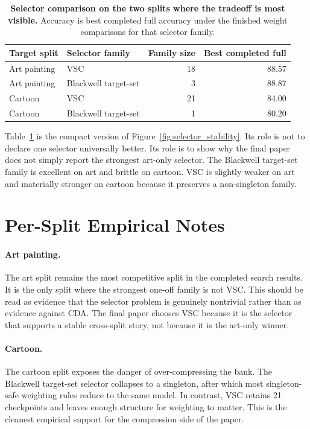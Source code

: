 \documentclass{article}
\theoremstyle{definition}
\begin{document}
\begin{table}[h]
\centering
\caption{\textbf{Selector comparison on the two splits where the tradeoff is most visible.} Accuracy is best completed full accuracy under the finished weight comparisons for that selector family.}
\label{tab:selector_tradeoff}
\begin{tabular}{llrr}
\toprule
Target split & Selector family & Family size & Best completed full \\
\midrule
Art painting & VSC & 18 & 88.57 \\
Art painting & Blackwell target-set & 3 & 88.87 \\
Cartoon & VSC & 21 & 84.00 \\
Cartoon & Blackwell target-set & 1 & 80.20 \\
\bottomrule
\end{tabular}
\end{table}

Table~\ref{tab:selector_tradeoff} is the compact version of Figure~\ref{fig:selector_stability}. Its role is not to declare one selector universally better. Its role is to show why the final paper does not simply report the strongest art-only selector. The Blackwell target-set family is excellent on art and brittle on cartoon. VSC is slightly weaker on art and materially stronger on cartoon because it preserves a non-singleton family.

\section{Per-Split Empirical Notes}

\paragraph{Art painting.}
The art split remains the most competitive split in the completed search results. It is the only split where the strongest one-off family is not VSC. This should be read as evidence that the selector problem is genuinely nontrivial rather than as evidence against CDA. The final paper chooses VSC because it is the selector that supports a stable cross-split story, not because it is the art-only winner.

\paragraph{Cartoon.}
The cartoon split exposes the danger of over-compressing the bank. The Blackwell target-set selector collapses to a singleton, after which most singleton-safe weighting rules reduce to the same model. In contrast, VSC retains 21 checkpoints and leaves enough structure for weighting to matter. This is the cleanest empirical support for the compression side of the paper.
\end{document}
